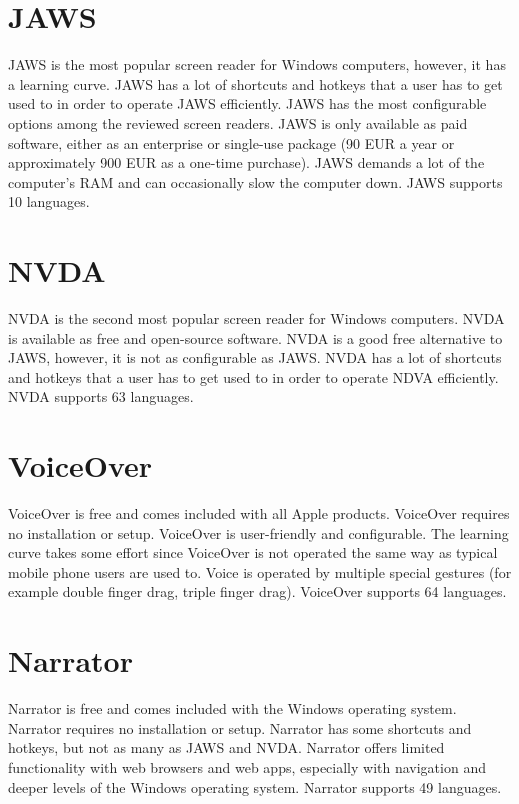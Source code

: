 \section{JAWS}
JAWS is the most popular screen reader for Windows computers, however, it has a learning curve. JAWS has a lot of shortcuts and hotkeys that a user has to get used to in order to operate JAWS efficiently. JAWS has the most configurable options among the reviewed screen readers. JAWS is only available as paid software, either as an enterprise or single-use package (90 EUR a year or approximately 900 EUR as a one-time purchase). JAWS demands a lot of the computer's RAM and can occasionally slow the computer down. JAWS supports 10 languages.

\section{NVDA}

NVDA is the second most popular screen reader for Windows computers. NVDA is available as free and open-source software. NVDA is a good free alternative to JAWS, however, it is not as configurable as JAWS. NVDA has a lot of shortcuts and hotkeys that a user has to get used to in order to operate NDVA efficiently. NVDA supports 63 languages.

\section{VoiceOver}

VoiceOver is free and comes included with all Apple products. VoiceOver requires no installation or setup. VoiceOver is user-friendly and configurable. The learning curve takes some effort since VoiceOver is not operated the same way as typical mobile phone users are used to. Voice is operated by multiple special gestures (for example double finger drag, triple finger drag). VoiceOver supports 64 languages.

\section{Narrator}

Narrator is free and comes included with the Windows operating system. Narrator requires no installation or setup. Narrator has some shortcuts and hotkeys, but not as many as JAWS and NVDA. Narrator offers limited functionality with web  browsers and web apps, especially with navigation and deeper levels of the Windows operating system. Narrator supports 49 languages.

